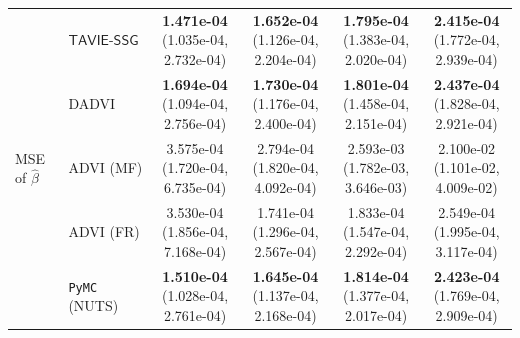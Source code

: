 \documentclass[12pt]{article}
\numberwithin{equation}{section}
\newcommand{\tssg}{\mathsf{TAVIE}\text{-}\mathsf{SSG}}
\begin{document}
{\begin{longtable}{llcccc}
\multirow{5}{*}{MSE of $\widehat{\beta}$}
& $\tssg$ & \makecell[c]{\textbf{1.471e-04}\\(1.035e-04, 2.732e-04)} & \makecell[c]{\textbf{1.652e-04}\\(1.126e-04, 2.204e-04)} & \makecell[c]{\textbf{1.795e-04}\\(1.383e-04, 2.020e-04)} & \makecell[c]{\textbf{2.415e-04}\\(1.772e-04, 2.939e-04)} \\
& DADVI & \makecell[c]{\textbf{1.694e-04}\\(1.094e-04, 2.756e-04)} & \makecell[c]{\textbf{1.730e-04}\\(1.176e-04, 2.400e-04)} & \makecell[c]{\textbf{1.801e-04}\\(1.458e-04, 2.151e-04)} & \makecell[c]{\textbf{2.437e-04}\\(1.828e-04, 2.921e-04)} \\
& ADVI (MF) & \makecell[c]{3.575e-04\\(1.720e-04, 6.735e-04)} & \makecell[c]{2.794e-04\\(1.820e-04, 4.092e-04)} & \makecell[c]{2.593e-03\\(1.782e-03, 3.646e-03)} & \makecell[c]{2.100e-02\\(1.101e-02, 4.009e-02)} \\
& ADVI (FR) & \makecell[c]{3.530e-04\\(1.856e-04, 7.168e-04)} & \makecell[c]{1.741e-04\\(1.296e-04, 2.567e-04)} & \makecell[c]{1.833e-04\\(1.547e-04, 2.292e-04)} & \makecell[c]{2.549e-04\\(1.995e-04, 3.117e-04)} \\
& \texttt{PyMC} (NUTS) & \makecell[c]{\textbf{1.510e-04}\\(1.028e-04, 2.761e-04)} & \makecell[c]{\textbf{1.645e-04}\\(1.137e-04, 2.168e-04)} & \makecell[c]{\textbf{1.814e-04}\\(1.377e-04, 2.017e-04)} & \makecell[c]{\textbf{2.423e-04}\\(1.769e-04, 2.909e-04)} \\
\hline


\end{longtable}}
\end{document}
